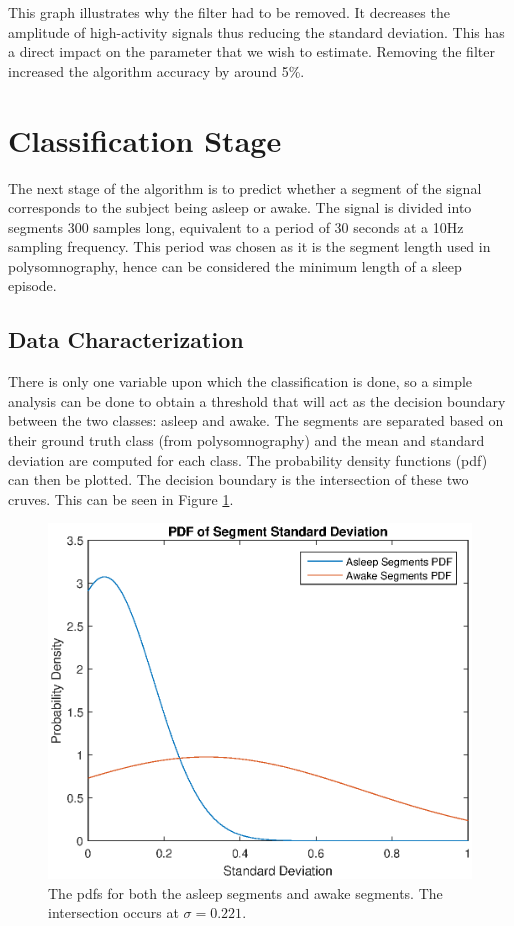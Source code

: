             This graph illustrates why the filter had to be removed. It decreases the amplitude of high-activity signals thus reducing the standard deviation. This has a direct impact on the parameter that we wish to estimate. Removing the filter increased the algorithm accuracy by around 5\%.           

        \section{Classification Stage}

            The next stage of the algorithm is to predict whether a segment of the signal corresponds to the subject being asleep or awake. The signal is divided into segments 300 samples long, equivalent to a period of 30 seconds at a 10Hz sampling frequency. This period was chosen as it is the segment length used in polysomnography, hence can be considered the minimum length of a sleep episode.

            \subsection{Data Characterization}

                There is only one variable upon which the classification is done, so a simple analysis can be done to obtain a threshold that will act as the decision boundary between the two classes: asleep and awake. The segments are separated based on their ground truth class (from polysomnography) and the mean and standard deviation are computed for each class. The probability density functions (pdf) can then be plotted. The decision boundary is the intersection of these two cruves. This can be seen in Figure \ref{img_pdfs}.

                \begin{figure}[h]
                    \includegraphics[width=\textwidth]{Images/segment_pdfs.eps}
                    \centering
                    \caption{The pdfs for both the asleep segments and awake segments. The intersection occurs at $\sigma = 0.221$.}
                    \label{img_pdfs}
                \end{figure}

